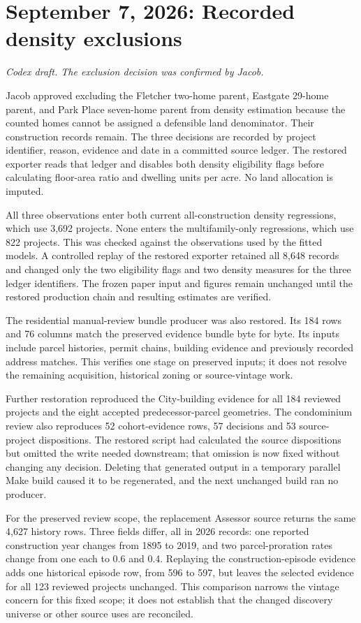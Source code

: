 \section*{September 7, 2026: Recorded density exclusions}
\textit{Codex draft. The exclusion decision was confirmed by Jacob.}

Jacob approved excluding the Fletcher two-home parent, Eastgate 29-home parent,
and Park Place seven-home parent from density estimation because the counted
homes cannot be assigned a defensible land denominator. Their construction
records remain. The three decisions are recorded by project identifier, reason,
evidence and date in a committed source ledger. The restored exporter reads
that ledger and disables both density eligibility flags before calculating
floor-area ratio and dwelling units per acre. No land allocation is imputed.

All three observations enter both current all-construction density regressions,
which use 3,692 projects. None enters the multifamily-only regressions, which
use 822 projects. This was checked against the observations used by the fitted
models. A controlled replay of the restored exporter retained all 8,648 records
and changed only the two eligibility flags and two density measures for the three
ledger identifiers. The frozen paper input and figures remain unchanged until
the restored production chain and resulting estimates are verified.

The residential manual-review bundle producer was also restored. Its 184 rows
and 76 columns match the preserved evidence bundle byte for byte. Its inputs
include parcel histories, permit chains, building evidence and previously
recorded address matches. This verifies one stage on preserved inputs; it does
not resolve the remaining acquisition, historical zoning or source-vintage work.

Further restoration reproduced the City-building evidence for all 184 reviewed
projects and the eight accepted predecessor-parcel geometries. The condominium
review also reproduces 52 cohort-evidence rows, 57 decisions and 53 source-project
dispositions. The restored script had calculated the source dispositions but
omitted the write needed downstream; that omission is now fixed without changing
any decision. Deleting that generated output in a temporary parallel Make build
caused it to be regenerated, and the next unchanged build ran no producer.

For the preserved review scope, the replacement Assessor source returns the same
4,627 history rows. Three fields differ, all in 2026 records: one reported
construction year changes from 1895 to 2019, and two parcel-proration rates change
from one each to 0.6 and 0.4. Replaying the construction-episode evidence adds one
historical episode row, from 596 to 597, but leaves the selected evidence for all
123 reviewed projects unchanged. This comparison narrows the vintage concern
for this fixed scope; it does not establish that the changed discovery universe
or other source uses are reconciled.

